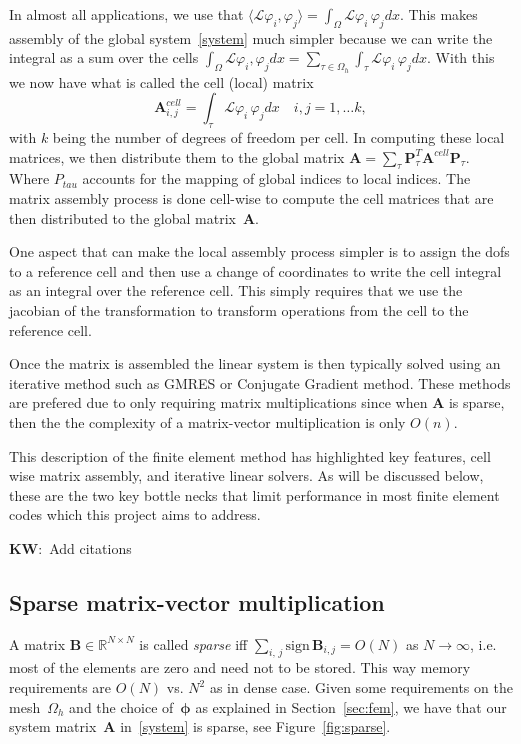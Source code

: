 \documentclass[12pt]{article}
\newcommand{\vect}[1]{\boldsymbol{\mathbf{#1}}}
\newcommand{\KW}[1]{{\color{blue}\textbf{KW}:~#1}}
\newcommand{\dimSize}{N}
\begin{document}
In almost all applications, we use that 
$\langle \mathcal{L}\varphi_{i}, \varphi_{j}\rangle = \int_{\Omega}\mathcal{L}\varphi_{i}\, \varphi_{j}dx $. This makes assembly of the global system~\eqref{system} much simpler because we can write the integral as a sum over the cells $ \int_{\Omega}\mathcal{L}\varphi_{i}, \varphi_{j}dx = \sum_{\tau\in\Omega_h} \int_{\tau}\mathcal{L}\varphi_{i}\, \varphi_{j}dx $. With this we now have what is called the cell (local) matrix 
$$ 
	\mathbf{A}^{cell}_{i,j} = \int_{\tau}\mathcal{L}\varphi_{i}\, \varphi_{j}dx\quad i, j = 1, \ldots k,
$$ 
with $k$ being the number of degrees of freedom per cell. In computing these local matrices, we then distribute them to the global matrix $ \mathbf{A} = \sum_{\tau}\vect P^{T}_{\tau}\mathbf{A}^{cell}\vect P_{\tau} $. Where $P_{tau}$ accounts for the mapping of global indices to local indices. The matrix assembly process is done cell-wise to compute the cell matrices that are then distributed to the global matrix~$\vect A$. 

One aspect that can make the local assembly process simpler is to assign the dofs to a reference cell and then use a change of coordinates to write the cell integral as an integral over the reference cell. This simply requires that we use the jacobian of the transformation to transform operations from the cell to the reference cell.

Once the matrix is assembled the linear system is then typically solved using an iterative method such as GMRES or Conjugate Gradient method. These methods are prefered due to only requiring matrix multiplications since when $\mathbf{A}$ is sparse, then the the complexity of a matrix-vector multiplication is only $O(n)$. 

This description of the finite element method has highlighted key features, cell wise matrix assembly, and iterative linear solvers. As will be discussed below, these are the two key bottle necks that limit performance in most finite element codes which this project aims to address. 

\KW{Add citations}

\subsection{Sparse matrix-vector multiplication}\label{sec:crs}

A matrix $\vect B \in \mathbb R^{\dimSize\times\dimSize}$ is called \textit{sparse} iff $\sum_{i,\,j} \mbox{sign}\,\vect B_{i,j} = O(\dimSize)$ as $\dimSize \rightarrow \infty$, i.e. most of the elements are zero and need not to be stored. This way memory requirements are $O(\dimSize)$ vs. $\dimSize^2$ as in dense case. Given some requirements on the mesh~$\Omega_h$ and the choice of~$\vect\phi$ as explained in Section~\ref{sec:fem}, we have that our system matrix~$\vect A$ in~\eqref{system} is sparse, see Figure~\ref{fig:sparse}.
\end{document}
